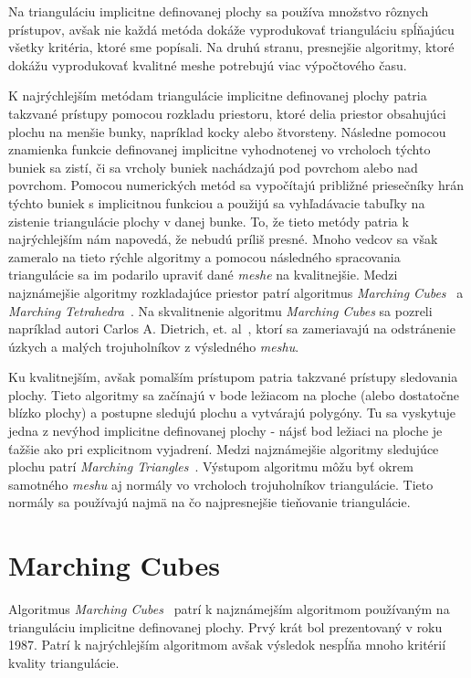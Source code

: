 Na trianguláciu implicitne definovanej plochy sa používa množstvo rôznych prístupov, 
avšak nie každá metóda dokáže vyprodukovať trianguláciu spĺňajúcu všetky kritéria, 
ktoré sme popísali. Na druhú stranu, presnejšie algoritmy, ktoré dokážu vyprodukovať 
kvalitné meshe potrebujú viac výpočtového času. 

K najrýchlejším metódam triangulácie implicitne definovanej plochy patria takzvané prístupy pomocou rozkladu
priestoru, ktoré delia priestor obsahujúci plochu na menšie bunky, napríklad kocky alebo štvorsteny. 
Následne pomocou znamienka funkcie definovanej implicitne vyhodnotenej vo vrcholoch týchto buniek
sa zistí, či sa vrcholy buniek nachádzajú pod povrchom alebo nad povrchom. 
Pomocou numerických metód sa vypočítajú približné priesečníky hrán týchto buniek s 
implicitnou funkciou a použijú sa vyhľadávacie tabuľky na zistenie triangulácie plochy v danej bunke. 
To, že tieto metódy patria k najrýchlejším nám napovedá, že nebudú príliš presné. Mnoho vedcov sa
však zameralo na tieto rýchle algoritmy a pomocou následného spracovania triangulácie sa im 
podarilo upraviť dané \textit{meshe} na kvalitnejšie. 
Medzi najznámejšie algoritmy rozkladajúce priestor
patrí algoritmus \textit{Marching Cubes}~\cite{lorensen1987marching} a \textit{Marching Tetrahedra}~\cite{doi1991efficient}. 
Na skvalitnenie algoritmu \textit{Marching Cubes} sa pozreli napríklad
autori Carlos A. Dietrich, et. al~\cite{dietrich2009marching}, 
ktorí sa zameriavajú na odstránenie úzkych a malých trojuholníkov
z výsledného \textit{meshu}.

Ku kvalitnejším, avšak pomalším prístupom patria takzvané prístupy sledovania plochy.
Tieto algoritmy sa začínajú v bode ležiacom na ploche (alebo dostatočne blízko plochy) a 
postupne sledujú plochu a vytvárajú polygóny. Tu sa vyskytuje jedna z nevýhod implicitne definovanej
plochy - nájsť bod ležiaci na ploche je ťažšie ako pri explicitnom vyjadrení. Medzi najznámejšie 
algoritmy sledujúce plochu patrí \textit{Marching Triangles}~\cite{hilton1996marching}.
Výstupom algoritmu môžu byť okrem samotného \textit{meshu} aj normály vo vrcholoch trojuholníkov triangulácie.
Tieto normály sa používajú najmä na čo najpresnejšie tieňovanie triangulácie.

\section{Marching Cubes}

Algoritmus \textit{Marching Cubes}~\cite{lorensen1987marching} patrí k najznámejším algoritmom používaným
na trianguláciu implicitne definovanej plochy. Prvý krát bol prezentovaný v roku 1987. Patrí k najrýchlejším
algoritmom avšak výsledok nespĺňa mnoho kritérií kvality triangulácie. 

